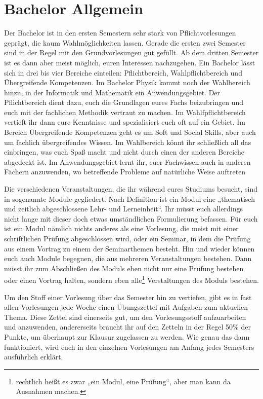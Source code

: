 \section{Bachelor Allgemein}
Der Bachelor ist in den ersten Semestern sehr stark von Pflichtvorlesungen geprägt, die kaum Wahlmöglichkeiten lassen. Gerade die ersten zwei Semester sind in der Regel mit den Grundvorlesungen gut gefüllt. Ab dem dritten Semester ist es dann aber meist möglich, euren Interessen nachzugehen. Ein Bachelor lässt sich in drei bis vier Bereiche einteilen: Pflichtbereich, Wahlpflichtbereich und Übergreifende Kompetenzen. Im Bachelor Physik kommt noch der Wahlbereich hinzu, in der Informatik und Mathematik ein Anwendungsgebiet. Der Pflichtbereich dient dazu, euch die Grundlagen eures Fachs beizubringen und euch mit der fachlichen Methodik vertraut zu machen. Im Wahlfpflichtbereich vertieft ihr dann eure Kenntnisse und spezialisiert euch oft auf ein Gebiet. Im Bereich Übergreifende Kompetenzen geht es um Soft und Social Skills, aber auch um fachlich übergreifendes Wissen. Im Wahlbereich könnt ihr schließlich all das einbringen, was euch Spaß macht und nicht durch einen der anderen Bereiche abgedeckt ist. Im Anwendungsgebiet lernt ihr, euer Fachwissen auch in anderen Fächern anzuwenden, wo betreffende Probleme auf natürliche Weise auftreten

Die verschiedenen Veranstaltungen, die ihr während eures Studiums besucht, sind in sogenannte Module gegliedert. Nach Definition ist ein Modul eine „thematisch und zeitlich abgeschlossene Lehr- und Lerneinheit“. Ihr müsst euch allerdings nicht lange mit dieser doch etwas umständlichen Formulierung befassen. Für euch ist ein Modul nämlich nichts anderes als eine Vorlesung, die meist mit einer schriftlichen Prüfung abgeschlossen wird, oder ein Seminar, in dem die Prüfung aus einem Vortrag zu einem der Seminarthemen besteht. Hin und wieder können euch auch Module begegnen, die aus mehreren Veranstaltungen bestehen. Dann müsst ihr zum Abschließen des Moduls eben nicht nur eine Prüfung bestehen oder einen Vortrag halten, sondern eben alle\footnote{rechtlich heißt es zwar „ein Modul, eine Prüfung“, aber man kann da Ausnahmen machen.} Verstaltungen des Moduls bestehen.

Um den Stoff einer Vorlesung über das Semester hin zu vertiefen, gibt es in fast allen Vorlesungen jede Woche einen Übungszettel mit Aufgaben zum aktuellen Thema. Diese Zettel sind einerseits gut, um den Vorlesungsstoff aufzuarbeiten und anzuwenden, andererseits braucht ihr auf den Zetteln in der Regel 50\% der Punkte, um überhaupt zur Klausur zugelassen zu werden. Wie genau das dann funktioniert, wird euch in den einzelnen Vorlesungen am Anfang jedes Semesters ausführlich erklärt.

